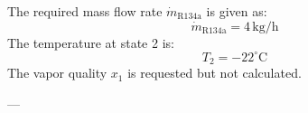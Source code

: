 The required mass flow rate \( \dot{m}_{\text{R134a}} \) is given as:  
\[
\dot{m}_{\text{R134a}} = 4 \, \text{kg/h}
\]  
The temperature at state 2 is:  
\[
T_2 = -22^\circ\text{C}
\]  
The vapor quality \( x_1 \) is requested but not calculated.

---